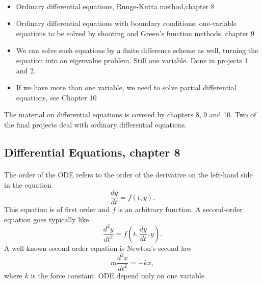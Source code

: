 \documentclass[%
oneside,                 %
final,                   %
10pt]{article}
\begin{document}
\paragraph{}
\begin{itemize}
 \item Ordinary differential equations, Runge-Kutta method,chapter 8

 \item Ordinary differential equations with boundary conditions: one-variable equations to be solved by shooting and Green's function methods, chapter 9

 \item We can solve such equations by a finite difference scheme as well, turning the equation into an eigenvalue problem. Still one variable. Done in projects 1 and 2.

 \item If we have more than one variable, we need to solve  partial differential equations, see Chapter 10
\end{itemize}

\noindent
The material on differential equations is covered by chapters 8, 9 and 10.
Two of  the final projects deal with ordinary differential equations.





\subsection{Differential Equations, chapter 8}

\paragraph{}
The order of the ODE refers to the order of the derivative 
on the left-hand side in the equation
\begin{equation} 
   \frac{dy}{dt}=f(t,y).
\end{equation}
This equation is of first order and $f$ is an arbitrary function.
A second-order equation goes typically like
\begin{equation} 
   \frac{d^2y}{dt^2}=f(t,\frac{dy}{dt},y).
\end{equation}
A well-known second-order equation is Newton's second law
\begin{equation} 
   m\frac{d^2x}{dt^2}=-kx,
   \label{eq:newton}
\end{equation}
where $k$ is the force constant. ODE depend only on one
variable
\end{document}
